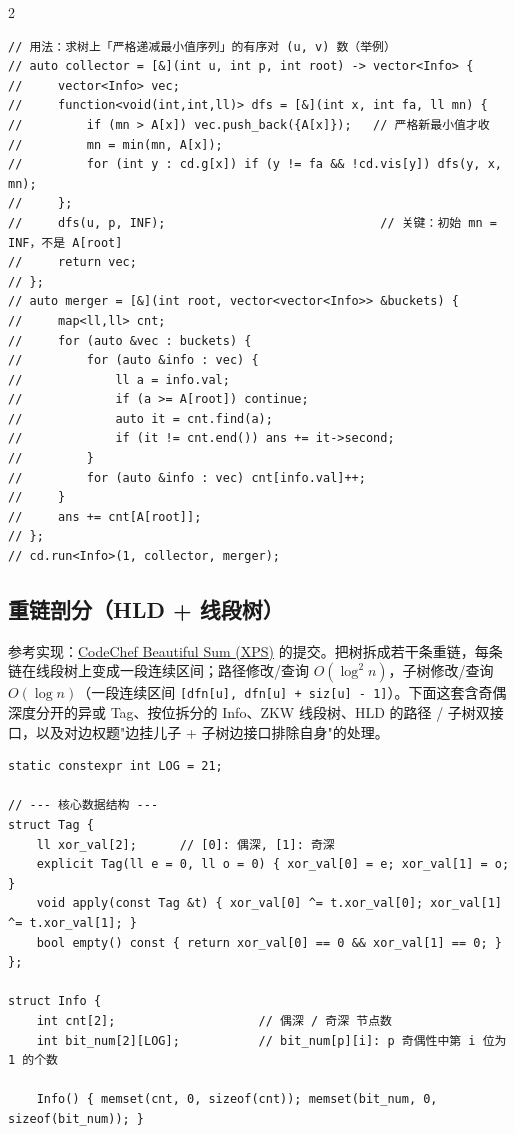 \begin{multicols*}{2}
\begin{verbatim}
// 用法：求树上「严格递减最小值序列」的有序对 (u, v) 数（举例）
// auto collector = [&](int u, int p, int root) -> vector<Info> {
//     vector<Info> vec;
//     function<void(int,int,ll)> dfs = [&](int x, int fa, ll mn) {
//         if (mn > A[x]) vec.push_back({A[x]});   // 严格新最小值才收
//         mn = min(mn, A[x]);
//         for (int y : cd.g[x]) if (y != fa && !cd.vis[y]) dfs(y, x, mn);
//     };
//     dfs(u, p, INF);                              // 关键：初始 mn = INF，不是 A[root]
//     return vec;
// };
// auto merger = [&](int root, vector<vector<Info>> &buckets) {
//     map<ll,ll> cnt;
//     for (auto &vec : buckets) {
//         for (auto &info : vec) {
//             ll a = info.val;
//             if (a >= A[root]) continue;
//             auto it = cnt.find(a);
//             if (it != cnt.end()) ans += it->second;
//         }
//         for (auto &info : vec) cnt[info.val]++;
//     }
//     ans += cnt[A[root]];
// };
// cd.run<Info>(1, collector, merger);
		\end{verbatim}


		\subsection{重链剖分（HLD + 线段树）}

		参考实现：\href{https://www.codechef.com/viewsolution/1209757778}{CodeChef Beautiful Sum (XPS)} 的提交。把树拆成若干条重链，每条链在线段树上变成一段连续区间；路径修改/查询 $O(\log^2 n)$，子树修改/查询 $O(\log n)$（一段连续区间 \texttt{[dfn[u], dfn[u] + siz[u] - 1]}）。下面这套含奇偶深度分开的异或 Tag、按位拆分的 Info、ZKW 线段树、HLD 的路径 / 子树双接口，以及对边权题"边挂儿子 + 子树边接口排除自身"的处理。

		\begin{verbatim}
static constexpr int LOG = 21;

// --- 核心数据结构 ---
struct Tag {
    ll xor_val[2];      // [0]: 偶深, [1]: 奇深
    explicit Tag(ll e = 0, ll o = 0) { xor_val[0] = e; xor_val[1] = o; }
    void apply(const Tag &t) { xor_val[0] ^= t.xor_val[0]; xor_val[1] ^= t.xor_val[1]; }
    bool empty() const { return xor_val[0] == 0 && xor_val[1] == 0; }
};

struct Info {
    int cnt[2];                    // 偶深 / 奇深 节点数
    int bit_num[2][LOG];           // bit_num[p][i]: p 奇偶性中第 i 位为 1 的个数

    Info() { memset(cnt, 0, sizeof(cnt)); memset(bit_num, 0, sizeof(bit_num)); }


\end{verbatim}
\end{multicols*}
